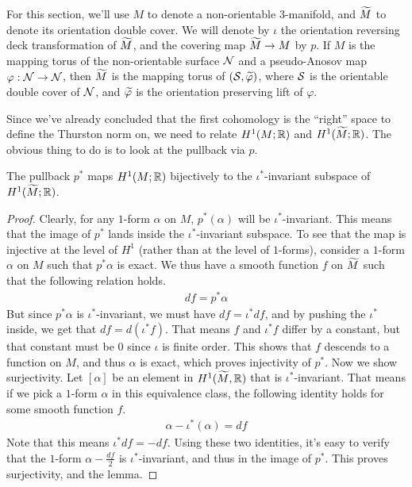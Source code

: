 For this section, we'll use $M$ to denote a non-orientable $3$-manifold, and $\widetilde{M}$ to denote its
orientation double cover. We will denote by $\iota$ the orientation reversing deck transformation
of $\widetilde{M}$, and the covering map $\widetilde{M} \to M$ by $p$. If $M$ is the mapping torus of the
non-orientable surface $\mathcal{N}$ and a pseudo-Anosov map $\varphi: \mathcal{N} \to \mathcal{N}$, then $\widetilde{M}$ is the
mapping torus of $(\mathcal{S}, \widetilde{\varphi})$, where $\mathcal{S}$ is the orientable double cover of $\mathcal{N}$, and
$\widetilde{\varphi}$ is the orientation preserving lift of $\varphi$.

Since we've already concluded that the first cohomology is the ``right'' space to define the
Thurston norm on, we need to relate $H^1(M; \mathbb{R})$ and $H^1(\widetilde{M}; \mathbb{R})$. The obvious thing to do
is to look at the pullback via $p$.

\begin{lem}
  \label{lem:injective}
  The pullback $p^{\ast}$ maps $H^1(M; \mathbb{R})$ bijectively to the $\iota^{\ast}$-invariant subspace of
  $H^1(\widetilde{M}; \mathbb{R})$.
\end{lem}
\begin{proof}
  Clearly, for any $1$-form $\alpha$ on $M$, $p^{\ast}(\alpha)$ will be
  $\iota^{\ast}$-invariant. This means that the image of $p^{\ast}$ lands inside the
  $\iota^{\ast}$-invariant subspace. To see that the map is injective at the level of $H^1$ (rather
  than at the level of $1$-forms), consider a $1$-form $\alpha$ on $M$ such that $p^{\ast}\alpha$
  is exact. We thus have a smooth function $f$ on $\widetilde{M}$ such that the following relation holds.
    \begin{align*}
        df = p^{\ast} \alpha
    \end{align*}
    But since $p^{\ast}\alpha$ is $\iota^{\ast}$-invariant, we must have $df = \iota^{\ast} df$,
    and by pushing the $\iota^{\ast}$ inside, we get that $df = d(\iota^{\ast}f)$. That means $f$
    and $\iota^{\ast}f$ differ by a constant, but that constant must be $0$ since $\iota$ is finite
    order. This shows that $f$ descends to a function on $M$, and thus $\alpha$ is exact, which
    proves injectivity of $p^{\ast}$. Now we show surjectivity. Let $[\alpha]$ be an element in
    $H^1(\widetilde{M}, \mathbb{R})$ that is $\iota^{\ast}$-invariant. That means if we pick a $1$-form $\alpha$
    in this equivalence class, the following identity holds for some smooth function $f$.
    \begin{align*}
        \alpha - \iota^{\ast}(\alpha) = df
    \end{align*}
    Note that this means $\iota^{\ast}df = -df$. Using these two identities, it's easy to verify
    that the $1$-form $\alpha - \frac{df}{2}$ is $\iota^{\ast}$-invariant, and thus in the image of
    $p^{\ast}$. This proves surjectivity, and the lemma.
\end{proof}

